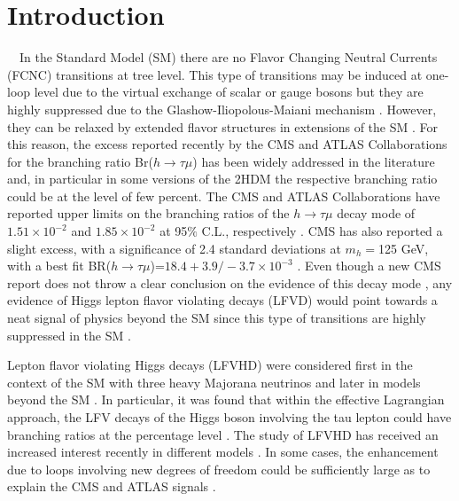 \documentclass[a4paper]{jpconf}
\begin{document}
\section{Introduction}
\ \ 
In the Standard Model (SM) there are no Flavor Changing Neutral Currents (FCNC) transitions at tree level. This type of transitions may be induced at one-loop level due to the virtual exchange of scalar or gauge bosons but they are highly suppressed due to the Glashow-Iliopolous-Maiani mechanism \cite{PhysRevD.2.1285}. However, they can be relaxed by extended flavor structures in extensions of the SM \cite{Perez:2003ad,Larios:2006pb}. For this reason, the excess reported recently by the CMS \cite{Khachatryan:2015kon} and ATLAS \cite{Aad:2015gha} Collaborations for the branching ratio Br($h\to\tau\mu$) has been widely addressed in the literature \cite{PILAFTSIS199268,DiazCruz:1999xe,Alvarado:2016par,Lee:2016dcb,Lami:2016mjf} and, in particular in some versions of the 2HDM \cite{Herrero-García2017,PhysRevD.90.115004,PhysRevD.92.015009} the respective branching ratio could be at the level of few percent. The CMS and ATLAS Collaborations have reported upper limits on the branching ratios of the $h\to\tau\mu$ decay mode of $1.51\times10^{-2}$ and $1.85\times10^{-2}$ at 95$ \% $ C.L., respectively \cite{Khachatryan:2015kon,Aad:2015gha}. CMS has also reported a slight excess, with a significance of 2.4 standard deviations at $m_h=$125 GeV, with a best fit BR($h\to\tau\mu$)=$18.4+3.9/-3.7\times10^{-3}$ \cite{Khachatryan:2015kon}. Even though a new CMS report does not throw a clear conclusion on the evidence of this decay mode \cite{CMS-PAS-HIG-16-043}, any evidence of Higgs lepton flavor violating decays (LFVD) would point towards a neat signal of physics beyond the SM since this type of transitions are highly suppressed in the SM \cite{Perez:2003ad,Larios:2006pb}.

Lepton flavor violating Higgs decays (LFVHD) were considered first in the context of the SM with three heavy Majorana neutrinos \cite{PILAFTSIS199268,DiazCruz:1999xe} and later in models beyond the SM \cite{DiazCruz:1999xe}. In particular, it was found that within the effective Lagrangian approach, the LFV decays of the Higgs boson involving the tau lepton could have branching ratios at the percentage level \cite{Alvarado:2016par}. The study of LFVHD has received an increased interest recently in different models \cite{delAguila:2017ugt,Chamorro-Solano:2016ugt,Lee:2016dcb,Lami:2016mjf,Moyotl2017205}. In some cases, the enhancement due to loops involving new degrees of freedom could be sufficiently large as to explain the CMS and ATLAS signals \cite{Khachatryan:2015kon,Aad:2015gha}.
\end{document}
